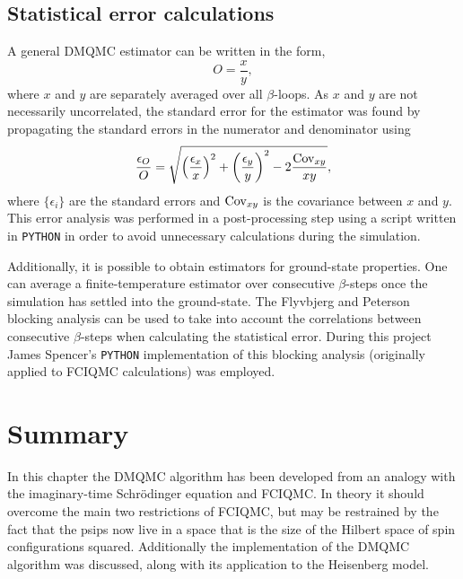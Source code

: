 \subsection{Statistical error calculations}
\label{sec:statErrCalc}
A general DMQMC estimator can be written in the form,
\begin{equation}
O = \frac{x}{y},
\end{equation} 
where $x$ and $y$ are separately averaged over all $\beta$-loops. As $x$ and $y$ are not necessarily uncorrelated, the standard error for the estimator was found by propagating the standard errors in the numerator and denominator using
\begin{equation}
\frac{\epsilon_O}{O} = \sqrt{\left(\frac{\epsilon_x}{x}\right)^2 + \left(\frac{\epsilon_y}{y}\right)^2 - 2\frac{\textnormal{Cov}_{xy}}{xy}},
\end{equation}
where $\{\epsilon_i\}$ are the standard errors and $\textnormal{Cov}_{xy}$ is the covariance between $x$ and $y$. This error analysis was performed in a post-processing step using a script written in \texttt{PYTHON} in order to avoid unnecessary calculations during the simulation. 

Additionally, it is possible to obtain estimators for ground-state properties. One can average a finite-temperature estimator over consecutive $\beta$-steps once the simulation has settled into the ground-state. The Flyvbjerg and Peterson blocking analysis\cite{Flyvbjerg1989} can be used to take into account the correlations between consecutive $\beta$-steps when calculating the statistical error. During this project James Spencer's \texttt{PYTHON} implementation of this blocking analysis (originally applied to FCIQMC calculations) was employed.

\section{Summary}
In this chapter the DMQMC algorithm has been developed from an analogy with the imaginary-time Schr\"odinger equation and FCIQMC. In theory it should overcome the main two restrictions of FCIQMC, but may be restrained by the fact that the psips now live in a space that is the size of the Hilbert space of spin configurations squared. Additionally the implementation of the DMQMC algorithm was discussed, along with its application to the Heisenberg model.

 


